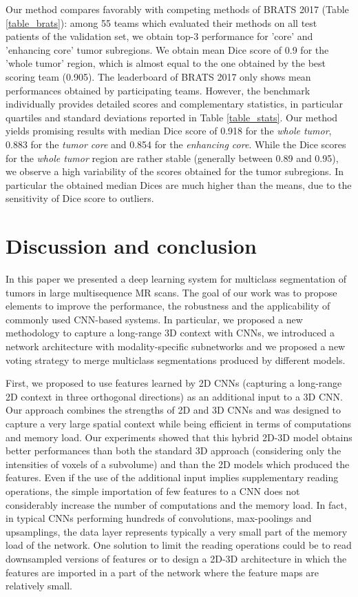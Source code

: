 \documentclass[preprint,12pt]{elsarticle}
\begin{document}
Our method compares favorably with competing methods of BRATS 2017 (Table \ref{table_brats}): among 55 teams which evaluated their methods on all test patients of the validation set, we obtain top-3 performance for 'core' and 'enhancing core' tumor subregions. We obtain mean Dice score of 0.9 for the 'whole tumor' region, which is almost equal to the one obtained by the best scoring team (0.905). The leaderboard of BRATS 2017 only shows mean performances obtained by participating teams. However, the benchmark individually provides detailed scores and complementary statistics, in particular quartiles and standard deviations reported in Table \ref{table_stats}. Our method yields promising results with median Dice score of 0.918 for the \textit{whole tumor}, 0.883 for the \textit{tumor core} and 0.854 for the \textit{enhancing core}. While the Dice scores for the \textit{whole tumor} region are rather stable (generally between 0.89 and 0.95), we observe a high variability of the scores obtained for the tumor subregions. In particular the obtained median Dices are much higher than the means, due to the sensitivity of Dice score to outliers.


\section{Discussion and conclusion}
In this paper we presented a deep learning system for multiclass segmentation of tumors in large multisequence MR scans. The goal of our work was to propose elements to improve the performance, the robustness and the applicability of commonly used CNN-based systems. In particular, we proposed a new methodology to capture a long-range 3D context with CNNs, we introduced a network architecture with modality-specific subnetworks and we proposed a new voting strategy to merge multiclass segmentations produced by different models.


First, we proposed to use features learned by 2D CNNs (capturing a long-range 2D context in three orthogonal directions) as an additional input to a 3D CNN. Our approach combines the strengths of 2D and 3D CNNs and was designed to capture a very large spatial context while being efficient in terms of computations and memory load. Our experiments showed that this hybrid 2D-3D model obtains better performances than both the standard 3D approach (considering only the intensities of voxels of a subvolume) and than the 2D models which produced the features. Even if the use of the additional input implies supplementary reading operations, the simple importation of few features to a CNN does not considerably increase the number of computations and the memory load. In fact, in typical CNNs performing hundreds of convolutions, max-poolings and upsamplings, the data layer represents typically a very small part of the memory load of the network. One solution to limit the reading operations could be to read downsampled versions of features or to design a 2D-3D architecture in which the features are imported in a part of the network where the feature maps are relatively small. 
\end{document}
